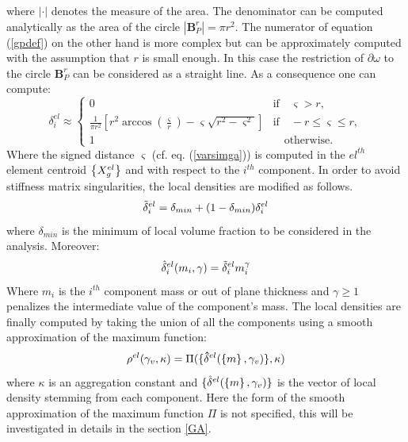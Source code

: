 where $|\cdot|$ denotes the measure of the area. The denominator can be computed analytically as the area of the circle  $|\mathbf{B}_P^r|=\pi r^2$. The numerator of equation (\ref{gpdef}) on the other hand is more complex but can be approximately computed with the assumption that $r$ is small enough. In this case the restriction of $\partial \omega$ to the circle $\mathbf{B}_P^r$ can be considered as a straight line. As a consequence one can compute:
\begin{equation}
\label{eq:dN}
    \delta^{el}_i\approx
    \begin{cases}
    0 & \text{if}\quad\varsigma>r,\\
    \frac{1}{\pi r^2}\left[r^2\arccos{\left(\frac{\varsigma}{r}\right)}-\varsigma\sqrt{r^2-\varsigma^2}\right]& \text{if} \quad-r\leq \varsigma\leq r,\\
    1 &\quad \text{otherwise}.
    \end{cases}
\end{equation}
Where the signed distance $\varsigma$ (cf. eq. (\ref{varsimga})) is computed in the $el^{th}$ element centroid $\left\{{X_g^{el}}\right\}$ and with respect to the $i^{th}$ component.
In order to avoid stiffness matrix singularities, the local densities are modified as follows.
\begin{equation}
    \Tilde{\delta}^{el}_i=\delta_{min}+(1-\delta_{min})\delta^{el}_i
\end{equation}
where $\delta_{min}$ is the minimum of local volume fraction to be considered in the analysis.
Moreover:
\begin{equation}
\label{eq:25}
    \hat{\delta}_i^{el}( m_i,\gamma )=\Tilde{\delta}^{el}_i m_i^\gamma  
\end{equation}
Where $m_i$ is the $i^{th}$ component mass or out of plane thickness \cite{norato2015geometry} and  $\gamma\geq1$ penalizes the intermediate value of the component's mass.
The local densities are finally computed by taking the union of all the components using a smooth approximation of the maximum function:
\begin{equation}
    \rho^{el}(\gamma_v ,\kappa)  =\Pi(\lbrace\mathbf{\hat{\delta}}^{el}(\left\{{m}\right\},\gamma_v )\rbrace,\kappa) 
\end{equation}
where $\kappa$ is an aggregation constant and $\lbrace\hat{\delta}^{el}(\left\{{m}\right\},\gamma_v )\rbrace$ is the vector of local density stemming from each component. Here the form of the smooth approximation of the maximum function $\Pi$ is not specified, this will be investigated in details in the section \ref{GA}. 
